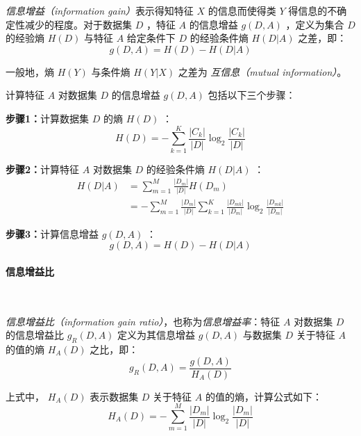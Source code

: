 \documentclass{ctexart}
\numberwithin{equation}{section}
\begin{document}
\emph{信息增益（information gain）}表示得知特征 $X$ 的信息而使得类 $Y$ 得信息的不确定性减少的程度。对于数据集 $D$ ，特征 $A$ 的信息增益 $g(D,A)$ ，定义为集合 $D$ 的经验熵 $H(D)$ 与特征 $A$ 给定条件下 $D$ 的经验条件熵 $H(D|A)$ 之差，即：
\begin{equation}
	g(D,A) = H(D) - H(D|A)
\end{equation}

一般地，熵 $H(Y)$ 与条件熵  $H(Y|X)$ 之差为 \emph{互信息（mutual information）}。

计算特征 $A$ 对数据集 $D$ 的信息增益 $g(D,A)$ 包括以下三个步骤：

\textbf{步骤1：}计算数据集 $D$ 的熵 $H(D)$ ：
	\begin{equation}
		H(D) = -\sum_{k=1}^{K} \frac{|C_k|}{|D|} \log_2 \frac{|C_k|}{|D|}
	\end{equation}

\textbf{步骤2：}计算特征 $A$ 对数据集 $D$ 的经验条件熵 $H(D|A)$ ：
	\begin{equation}
		\begin{split}
			H(D|A) &= \sum_{m=1}^{M} \frac{|D_m|}{|D|} H(D_m) \\
	               &= -\sum_{m=1}^{M} \frac{|D_m|}{|D|} \sum_{k=1}^K \frac{|D_{mk}|}{|D_m|} \log_2 \frac{|D_{mk}|}{|D_m|}
		\end{split}
	\end{equation}

\textbf{步骤3：}计算信息增益 $g(D,A)$ ：
	\begin{equation}
		g(D,A) = H(D) - H(D|A)
	\end{equation}


\paragraph{信息增益比}~{}

\emph{信息增益比（information gain ratio）}，也称为\emph{信息增益率}：特征 $A$ 对数据集 $D$ 的信息增益比 $g_R(D,A)$ 定义为其信息增益 $g(D,A)$ 与数据集 $D$ 关于特征 $A$ 的值的熵 $H_A(D)$ 之比，即：
\begin{equation}
	g_R(D,A) = \frac{g(D,A)}{H_A(D)}
\end{equation}

上式中， $H_A(D)$ 表示数据集 $D$ 关于特征 $A$ 的值的熵，计算公式如下：
\begin{equation}
	H_A(D) = -\sum_{m=1}^{M} \frac{|D_m|}{|D|} \log_2 \frac{|D_m|}{|D|}
\end{equation}


\end{document}

